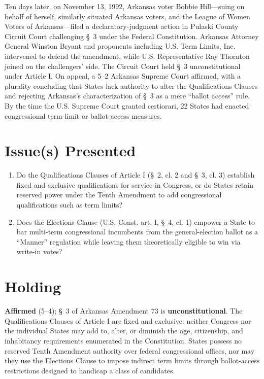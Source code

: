 \documentclass[12pt]{article}
\begin{document}
Ten days later, on November 13, 1992, Arkansas voter Bobbie Hill---suing on behalf of herself, similarly situated Arkansas voters, and the League of Women Voters of Arkansas---filed a declaratory-judgment action in Pulaski County Circuit Court challenging \S~3 under the Federal Constitution. Arkansas Attorney General Winston Bryant and proponents including U.S. Term Limits, Inc. intervened to defend the amendment, while U.S. Representative Ray Thornton joined on the challengers' side. The Circuit Court held \S~3 unconstitutional under Article I. On appeal, a 5--2 Arkansas Supreme Court affirmed, with a plurality concluding that States lack authority to alter the Qualifications Clauses and rejecting Arkansas's characterization of \S~3 as a mere ``ballot access'' rule. By the time the U.S. Supreme Court granted certiorari, 22 States had enacted congressional term-limit or ballot-access measures.

\section{Issue(s) Presented}

\begin{enumerate}
    \item Do the Qualifications Clauses of Article I (\S~2, cl. 2 and \S~3, cl. 3) establish fixed and exclusive qualifications for service in Congress, or do States retain reserved power under the Tenth Amendment to add congressional qualifications such as term limits?
    \item Does the Elections Clause (U.S. Const. art. I, \S~4, cl. 1) empower a State to bar multi-term congressional incumbents from the general-election ballot as a ``Manner'' regulation while leaving them theoretically eligible to win via write-in votes?
\end{enumerate}

\section{Holding}

\textbf{Affirmed} (5--4); \S~3 of Arkansas Amendment 73 is \textbf{unconstitutional}. The Qualifications Clauses of Article I are fixed and exclusive: neither Congress nor the individual States may add to, alter, or diminish the age, citizenship, and inhabitancy requirements enumerated in the Constitution. States possess no reserved Tenth Amendment authority over federal congressional offices, nor may they use the Elections Clause to impose indirect term limits through ballot-access restrictions designed to handicap a class of candidates.
\end{document}
